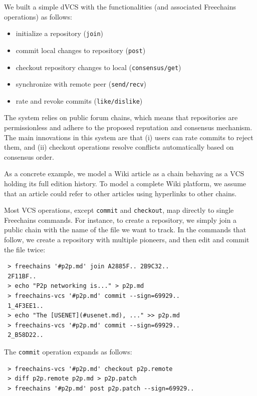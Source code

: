\documentclass[10pt,journal,compsoc]{IEEEtran}
\newcommand{\FC}       {Freechains\xspace}
\newcommand{\code}[1]  {\texttt{\footnotesize{#1}}}
\begin{document}
We built a simple dVCS with the functionalities (and associated \FC
operations) as follows:
%
\begin{itemize}
    \setlength{\itemindent}{-8pt}
    \item initialize a repository (\code{join})
    \item commit local changes to repository (\code{post})
    \item checkout repository changes to local (\code{consensus/get})
    \item synchronize with remote peer (\code{send/recv})
    \item rate and revoke commits (\code{like/dislike})
\end{itemize}
%
The system relies on public forum chains, which means that repositories are
permissionless and adhere to the proposed reputation and consensus mechanism.
The main innovations in this system are that
    (i)  users can rate commits to reject them, and
    (ii) checkout operations resolve conflicts automatically based on consensus
         order.

As a concrete example, we model a Wiki article as a chain behaving as a VCS
holding its full edition history.
To model a complete Wiki platform, we assume that an article could refer to
other articles using hyperlinks to other chains.

Most VCS operations, except \code{commit} and \code{checkout}, map directly to
single \FC commands.
For instance, to create a repository, we simply join a public chain with the
name of the file we want to track.
In the commands that follow, we create a repository with multiple pioneers, and
then edit and commit the file twice:

{\footnotesize
\begin{verbatim}
 > freechains '#p2p.md' join A2885F.. 2B9C32..
 2F11BF..
 > echo "P2p networking is..." > p2p.md
 > freechains-vcs '#p2p.md' commit --sign=69929..
 1_4F3EE1..
 > echo "The [USENET](#usenet.md), ..." >> p2p.md
 > freechains-vcs '#p2p.md' commit --sign=69929..
 2_B58D22..
\end{verbatim}
}

The \code{commit} operation expands as follows:

{\footnotesize
\begin{verbatim}
 > freechains-vcs '#p2p.md' checkout p2p.remote
 > diff p2p.remote p2p.md > p2p.patch
 > freechains '#p2p.md' post p2p.patch --sign=69929..
\end{verbatim}
}
\end{document}

